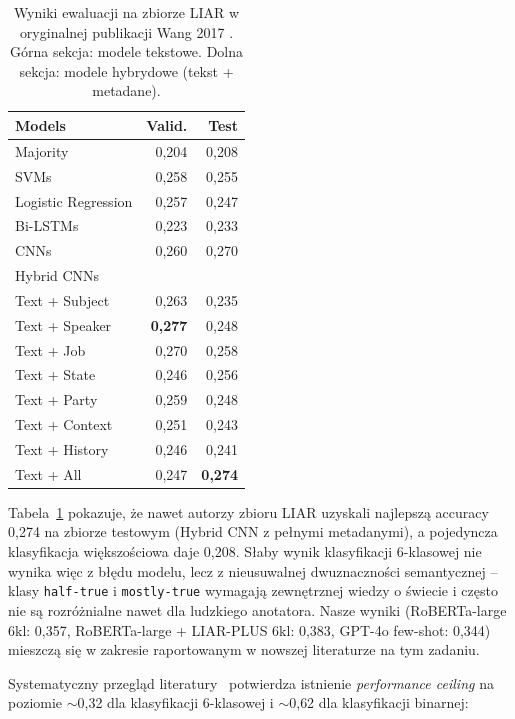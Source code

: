 \documentclass[11pt,a4paper]{article}
\begin{document}
\begin{table}[h]
\centering
\caption{Wyniki ewaluacji na zbiorze LIAR w oryginalnej publikacji Wang
2017 \cite{wang2017}. Górna sekcja: modele tekstowe. Dolna sekcja: modele
hybrydowe (tekst + metadane).}
\label{tab:wang2017}
\begin{tabular}{lrr}
\toprule
Models & Valid. & Test \\
\midrule
Majority             & 0{,}204 & 0{,}208 \\
SVMs                 & 0{,}258 & 0{,}255 \\
Logistic Regression  & 0{,}257 & 0{,}247 \\
Bi-LSTMs             & 0{,}223 & 0{,}233 \\
CNNs                 & 0{,}260 & 0{,}270 \\
\midrule
\multicolumn{3}{l}{Hybrid CNNs} \\
Text + Subject       & 0{,}263 & 0{,}235 \\
Text + Speaker       & \textbf{0{,}277} & 0{,}248 \\
Text + Job           & 0{,}270 & 0{,}258 \\
Text + State         & 0{,}246 & 0{,}256 \\
Text + Party         & 0{,}259 & 0{,}248 \\
Text + Context       & 0{,}251 & 0{,}243 \\
Text + History       & 0{,}246 & 0{,}241 \\
Text + All           & 0{,}247 & \textbf{0{,}274} \\
\bottomrule
\end{tabular}
\end{table}

Tabela~\ref{tab:wang2017} pokazuje, że nawet autorzy zbioru LIAR uzyskali
najlepszą accuracy 0{,}274 na zbiorze testowym (Hybrid CNN z pełnymi
metadanymi), a pojedyncza klasyfikacja większościowa daje 0{,}208. Słaby
wynik klasyfikacji 6-klasowej nie wynika więc z błędu modelu, lecz z
nieusuwalnej dwuznaczności semantycznej -- klasy \texttt{half-true} i
\texttt{mostly-true} wymagają zewnętrznej wiedzy o świecie i często nie są
rozróżnialne nawet dla ludzkiego anotatora. Nasze wyniki (RoBERTa-large
6kl: 0{,}357, RoBERTa-large + LIAR-PLUS 6kl: 0{,}383, GPT-4o few-shot:
0{,}344) mieszczą się w zakresie raportowanym w nowszej literaturze
na tym zadaniu.

Systematyczny przegląd literatury~\cite{emergentmind} potwierdza istnienie
\emph{performance ceiling} na poziomie $\sim$0{,}32 dla klasyfikacji
6-klasowej i $\sim$0{,}62 dla klasyfikacji binarnej:
\end{document}
